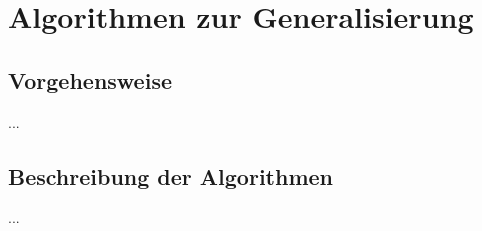 \documentclass[../main/thesis.tex]{subfiles}
\begin{document}
\chapter{Algorithmen zur Generalisierung}

\section{Vorgehensweise}

...






\section{Beschreibung der Algorithmen}

...

\end{document}
